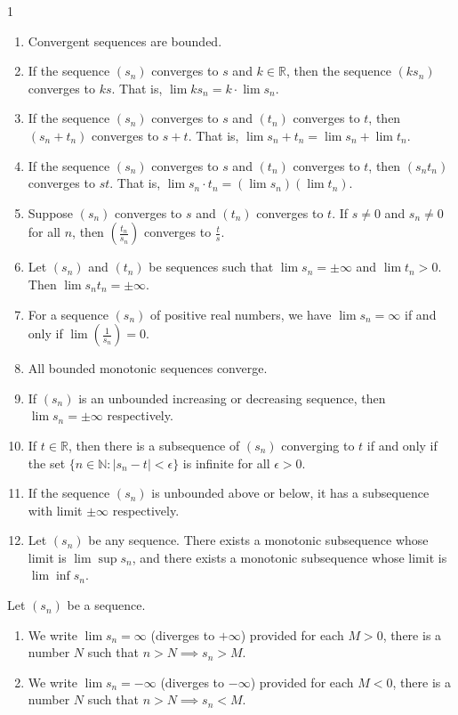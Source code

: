 \begin{theo}{1}
	\begin{enumerate}[i]
		\item Convergent sequences are bounded.
		\item If the sequence $(s_n)$ converges to $s$ and $k\in\mathbb{R}$, then the sequence $(ks_n)$ converges to $ks$. That is, $\lim ks_n=k\cdot \lim s_n$.
		\item If the sequence $(s_n)$ converges to $s$ and $(t_n)$ converges to $t$, then $(s_n+t_n)$ converges to $s+t$. That is, $\lim s_n+t_n=\lim s_n+\lim t_n$.
		\item If the sequence $(s_n)$ converges to $s$ and $(t_n)$ converges to $t$, then $(s_n t_n)$ converges to $st$. That is, $\lim s_n\cdot t_n=(\lim s_n)(\lim t_n)$.
		\item Suppose $(s_n)$ converges to $s$ and $(t_n)$ converges to $t$. If $s \neq 0$ and
		$s_n \neq 0$ for all $n$, then $(\frac{t_n}{s_n})$ converges to $\frac{t}{s}$.		
		\item Let $(s_n)$ and $(t_n)$ be sequences such that $\lim s_n=\pm\infty$ and $\lim t_n > 0$. Then $\lim s_n t_n = \pm\infty$.
		\item For a sequence $(s_n)$ of positive real numbers, we have $\lim s_n = \infty$
		if and only if $\lim(\frac{1}{s_n}) = 0$.
		\item All bounded monotonic sequences converge.
		\item If $(s_n)$ is an unbounded increasing or decreasing sequence, then $\lim s_n = \pm\infty$ respectively.
		\item If $t \in \mathbb{R}$, then there is a subsequence of $(s_n)$ converging to $t$ if and only if the set $\{n \in \mathbb{N} : |s_n − t| < \epsilon\}$ is infinite for all $\epsilon > 0$.
		\item If the sequence $(s_n)$ is unbounded above or below, it has a subsequence with limit $\pm \infty$ respectively.
		\item Let $(s_n)$ be any sequence. There exists a monotonic subsequence	whose limit is $\lim \sup s_n$, and there exists a monotonic subsequence	whose limit is $\lim \inf s_n$.
	\end{enumerate}
\end{theo}


\begin{defn}{1}
	Let $(s_n)$ be a sequence.
	\begin{enumerate}[i]
		\item We write $\lim s_n = \infty$ (diverges to $+\infty$) provided for each $M>0$, there is a number $N$ such that $n>N \implies s_n>M$.
		\item We write $\lim s_n = -\infty$ (diverges to $-\infty$) provided for each $M<0$, there is a number $N$ such that $n>N \implies s_n<M$.
	\end{enumerate}	
\end{defn}


